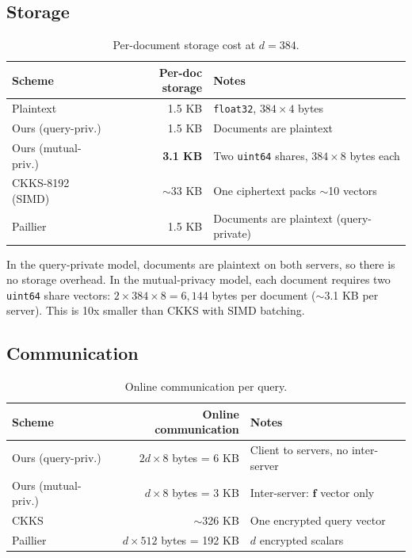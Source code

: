 \documentclass[11pt]{article}
\begin{document}
\subsection{Storage}

\begin{table}[h]
\centering
\caption{Per-document storage cost at $d = 384$.}
\label{tab:storage}
\begin{tabular}{lrl}
\toprule
Scheme & Per-doc storage & Notes \\
\midrule
Plaintext & 1.5 KB & \texttt{float32}, $384 \times 4$ bytes \\
Ours (query-priv.) & 1.5 KB & Documents are plaintext \\
Ours (mutual-priv.) & \textbf{3.1 KB} & Two \texttt{uint64} shares, $384 \times 8$ bytes each \\
CKKS-8192 (SIMD) & $\sim$33 KB & One ciphertext packs $\sim$10 vectors \\
Paillier & 1.5 KB & Documents are plaintext (query-private) \\
\bottomrule
\end{tabular}
\end{table}

In the query-private model, documents are plaintext on both servers, so there is no storage overhead. In the mutual-privacy model, each document requires two \texttt{uint64} share vectors: $2 \times 384 \times 8 = 6{,}144$ bytes per document ($\sim$3.1 KB per server). This is 10x smaller than CKKS with SIMD batching.

\subsection{Communication}

\begin{table}[h]
\centering
\caption{Online communication per query.}
\label{tab:comm}
\begin{tabular}{lrl}
\toprule
Scheme & Online communication & Notes \\
\midrule
Ours (query-priv.) & $2d \times 8$ bytes = 6 KB & Client to servers, no inter-server \\
Ours (mutual-priv.) & $d \times 8$ bytes = 3 KB & Inter-server: $\mathbf{f}$ vector only \\
CKKS & $\sim$326 KB & One encrypted query vector \\
Paillier & $d \times 512$ bytes = 192 KB & $d$ encrypted scalars \\
\bottomrule
\end{tabular}
\end{table}
\end{document}
